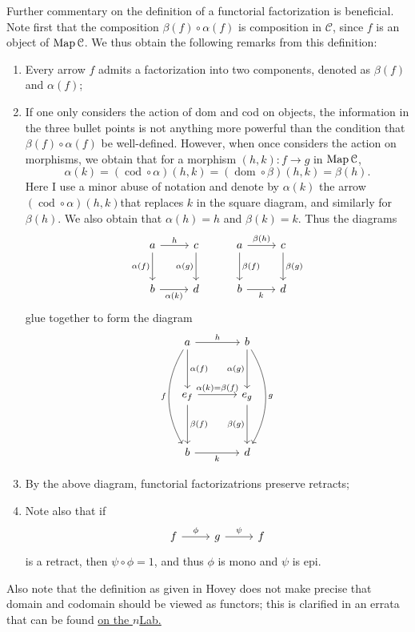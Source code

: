 \begin{remark}\label{1.1.2}
	Further commentary on the definition of a functorial factorization is beneficial. Note first that the composition $\beta(f)\circ \alpha(f)$ is composition in $\mathcal{C} $, since $f$ is an object of $\operatorname{Map} \mathcal{C} $. We thus obtain the following remarks from this definition:
	\begin{enumerate}
		\item Every arrow $f$ admits a factorization into two components, denoted as $\beta(f)$ and $\alpha(f)$;
		\item If one only considers the action of dom and cod on objects, the information in the three bullet points is not anything more powerful than the condition that $\beta(f)\circ \alpha(f)$ be well-defined. However, when once considers the action on morphisms, we obtain that for a morphism $(h,k): f \to g$ in $\operatorname{Map} \mathcal{C} $,
			\[
				\alpha(k)=(\operatorname{cod} \circ \alpha)(h,k)=(\operatorname{dom} \circ \beta)(h,k)=\beta(h)
			.\]
			Here I use a minor abuse of notation and denote by $\alpha(k)$ the arrow $(\operatorname{cod} \circ \alpha)(h,k)$that replaces $k$ in the square diagram, and similarly for $\beta(h)$. We also obtain that $\alpha(h)=h$ and $\beta(k)=k$. Thus the diagrams
			\[\begin{tikzcd}[row sep = 2.5em, column sep = 2.5em]
			a\ar[" \alpha(f) "', d] \ar[" h ", r]  & c\ar[" \alpha(g) "', d]  & a\ar[" \beta(f) ", d] \ar[" \beta(h) ", r]  & c\ar[" \beta(g) ", d] \\
			b \ar[" \alpha(k) "', r] & d & b \ar[" k "', r] & d
			\end{tikzcd}\]
			glue together to form the diagram
			\[\begin{tikzcd}[row sep = 3.5em, column sep = 3.5em]
			a\ar[" h ", r] \ar[" \alpha(f) ", d] \ar[" f "', bend right, dd]  & b \ar[" \alpha(g) "', d] \ar[" g ", bend left, dd]  \\
			e_f \ar[" \alpha(k)=\beta(f) ", r] \ar[" \beta(f) ", d]  & e_g \ar[" \beta(g) "', d]  \\
			b \ar[" k "', r] & d
			\end{tikzcd}\]
		\item By the above diagram, functorial factorizatrions preserve retracts;
		\item Note also that if
			\[\begin{tikzcd}[row sep = 2.5em, column sep = 2.5em]
			f\ar[" \phi ", r]  & g\ar[" \psi ", r]  & f
			\end{tikzcd}\]
			is a retract, then $\psi\circ \phi=1$, and thus $\phi$ is mono and $\psi$ is epi.
	\end{enumerate}
	Also note that the definition as given in Hovey does not make precise that domain and codomain should be viewed as functors; this is clarified in an errata that can be found \href{https://ncatlab.org/nlab/files/Hovey-ModelCategories-Errata.pdf}{on the $n$Lab.}
\end{remark}


